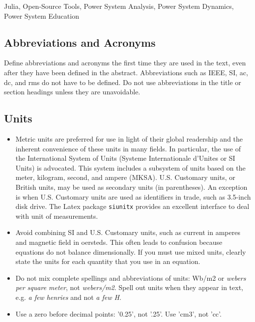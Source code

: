 \documentclass{IEEEtran4PSCC}
\begin{document}
\begin{abstract}
   
\end{abstract}


\begin{IEEEkeywords}
  Julia, Open-Source Tools, Power System Analysis, Power System Dynamics, Power System Education
\end{IEEEkeywords}







\lipsum[1-3]
\subsection{Abbreviations and Acronyms}
Define abbreviations and acronyms the first time they are used in the text, even after they have been defined in the abstract. Abbreviations such as IEEE, SI, ac, dc, and rms do not have to be defined. Do not use abbreviations in the title or section headings unless they are unavoidable.


\subsection{Units}
\begin{itemize}
\setlength\itemsep{1em}
 \item
 Metric units are preferred for use in light of their global readership and the inherent convenience of these units in many fields. In particular, the use of the International System of Units (Systeme Internationale d'Unites or SI Units) is advocated. This system includes a subsystem of units based on the meter, kilogram, second, and ampere (MKSA). U.S. Customary units, or British units, may be used as secondary units (in parentheses). An exception is when U.S. Customary units are used as identifiers in trade, such as 3.5-inch disk drive. The Latex package \verb+siunitx+ provides an excellent interface to deal with unit of measurements.
 
 \item 
 Avoid combining SI and U.S. Customary units, such as current in amperes and magnetic field in oersteds. This often leads to confusion because equations do not balance dimensionally. If you must use mixed units, clearly state the units for each quantity that you use in an equation.
 
 \item
 Do not mix complete spellings and abbreviations of units: Wb/m2 or \emph{webers per square meter}, not \emph{webers/m2}.  Spell out units when they appear in text, e.g. \emph{a few henries} and not \emph{a few H}.
 
 \item
 Use a zero before decimal points: '0.25', not '.25'. Use 'cm3', not 'cc'.
\end{itemize}
\end{document}
